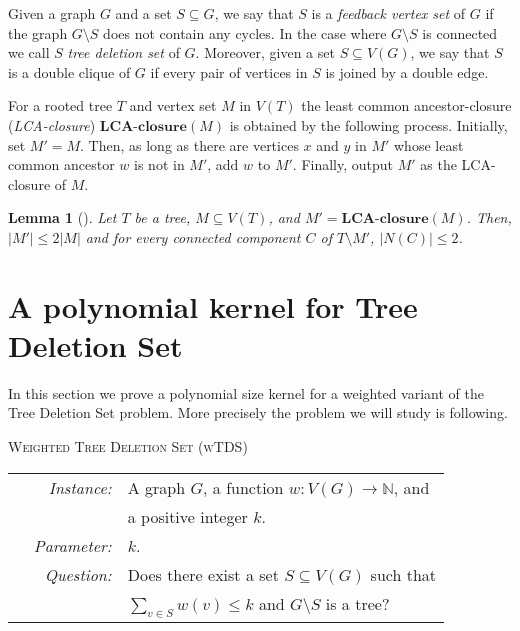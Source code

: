 \documentclass[a4paper,11pt]{article}
\newtheorem{lemma}{Lemma}
\newcommand{\lcac}{{\textbf{LCA-closure}}}
\begin{document}
Given a graph $G$ and a set $S\subseteq G$, we say that $S$ is a {\em feedback vertex set} of $G$ if the graph $G\setminus S$ does not contain any cycles. In the case
where $G\setminus S$ is connected we call $S$ {\em tree deletion set} of $G$.
Moreover, given a set $S\subseteq V(G)$, we say that $S$ is a double clique of $G$ if every pair of vertices in $S$ is joined by a double edge.

For a rooted tree $T$ and vertex set $M$ in $V(T)$ the least common ancestor-closure ({\em LCA-closure}) $\lcac(M)$ is obtained by the following process.
Initially, set $M'=M$. Then, as long as there are vertices $x$ and $y$ in $M'$ whose least common ancestor $w$ is not in $M'$, add $w$ to $M'$. Finally, output
$M'$ as the LCA-closure of $M$.

\begin{lemma}[\cite{FominLMS12}]\label{caclsbnd}
Let $T$ be a tree, $M\subseteq V(T)$, and $M'=\lcac(M)$. Then, $|M'|\leq 2|M|$ and for every connected component $C$ of $T\setminus M'$, $|N(C)|\leq 2$.
\end{lemma}


\section{A polynomial kernel for {\sc Tree Deletion Set}}
In this section we prove a polynomial size kernel for a weighted variant of the  {\sc Tree Deletion Set} problem. More precisely the problem we will study is following. 

\begin{center}
\begin{boxedminipage}{.99\textwidth}

\textsc{Weighted Tree Deletion Set  ({\sc wTDS})}

\begin{tabular}{ r l }
\textit{~~~~Instance:} & A graph $G$, a function $w:V(G)\rightarrow \mathbb{N}$, and\\
& a positive integer $k$. \\
\textit{Parameter:} & $k$.\\
\textit{Question:} & Does there exist a set $S\subseteq V(G)$ such that\\ 
& $\displaystyle \sum_{v\in S} w(v)\leq k$ and $G\setminus S$ is a tree? \\
\end{tabular}
\end{boxedminipage}
\end{center}
\end{document}
